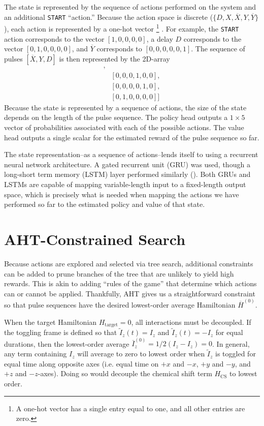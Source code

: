 The state is represented by the sequence of actions performed on the system and an additional \texttt{START} ``action.''
Because the action space is discrete ($\{ D, X, \overline{X}, Y, \overline{Y} \}$), each action is represented by a one-hot vector%
\footnote{
A one-hot vector has a single entry equal to one, and all other entries are zero.
}%
. For example, the \texttt{START} action corresponds to the vector $[1,0,0,0,0]$, a delay $D$ corresponds to the vector $[0,1,0,0,0,0]$, and $\overline{Y}$ corresponds to $[0,0,0,0,0,1]$. The sequence of pulses $[\overline{X}, Y, D]$ is then represented by the 2D-array
\begin{align*}
    [&[1,0,0,0,0,0], \\
    &[0,0,0,1,0,0], \\
    &[0,0,0,0,1,0], \\
    &[0,1,0,0,0,0]]
\end{align*}
Because the state is represented by a sequence of actions, the size of the state depends on the length of the pulse sequence.
The policy head outputs a $1 \times 5$ vector of probabilities associated with each of the possible actions. The value head outputs a single scalar for the estimated reward of the pulse sequence so far.

The state representation--as a sequence of actions--lends itself to using a recurrent neural network architecture. A gated recurrent unit (GRU) was used, though a long-short term memory (LSTM) layer performed similarly (\cite{cho2014learning, lstm}).
Both GRUs and LSTMs are capable of mapping variable-length input to a fixed-length output space, which is precisely what is needed when mapping the actions we have performed so far to the estimated policy and value of that state.


\section{AHT-Constrained Search}\label{sec:AHT-constraints}

Because actions are explored and selected via tree search, additional constraints can be added to prune branches of the tree that are unlikely to yield high rewards.
This is akin to adding ``rules of the game'' that determine which actions can or cannot be applied.
Thankfully, AHT gives us a straightforward constraint so that pulse sequences have the desired lowest-order average Hamiltonian $\overline{H}^{(0)}$.


When the target Hamiltonian $H_\text{target} = 0$, all interactions must be decoupled. If the toggling frame is defined so that $\widetilde{I}_z(t) = I_z$ and $\widetilde{I}_z(t) = -I_z$ for equal durations, then the lowest-order average $\overline{I}_z^{(0)} = 1/2(I_z - I_z) = 0$. In general, any term containing $I_z$ will average to zero to lowest order when $\widetilde{I}_z$ is toggled for equal time along opposite axes (i.e. equal time on $+x$ and $-x$, $+y$ and $-y$, and $+z$ and $-z$-axes).
Doing so would decouple the chemical shift term $H_\text{CS}$ to lowest order.

